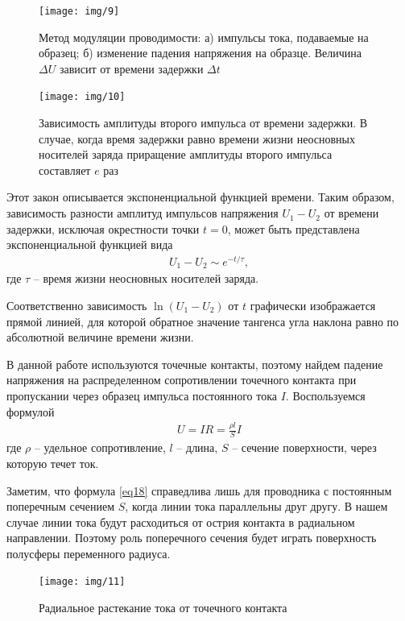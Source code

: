\begin{figure}[H]
	\centering
	\texttt{[image: img/9]}
	\caption{Метод модуляции проводимости: а) импульсы тока, подаваемые на образец; б) изменение падения напряжения на образце. Величина $\Delta U$ зависит от времени задержки $\Delta t$}
	\label{fig:figure8}
\end{figure}

\begin{figure}[H]
	\centering
	\texttt{[image: img/10]}
	\caption{Зависимость амплитуды второго импульса от времени задержки. В случае, когда время задержки равно времени жизни неосновных носителей заряда приращение амплитуды второго импульса составляет $e$ раз}
	\label{fig:figure9}
\end{figure}



Этот закон описывается экспоненциальной функцией времени. Таким образом, зависимость разности амплитуд импульсов напряжения  $U_1-U_2$ от времени задержки, исключая окрестности точки $t = 0$, может быть представлена экспоненциальной функцией вида
\begin{gather}
	\label{eq17}
	U_{1}-U_{2} \sim e^{-t/\tau},
\end{gather}
где $\tau$ -- время жизни неосновных носителей заряда.

Соответственно зависимость $\ln(U_1-U_2)$ от $t$ графически изображается прямой линией, для которой обратное значение тангенса угла наклона равно по абсолютной величине времени жизни.

В данной работе используются точечные контакты, поэтому найдем падение напряжения на распределенном сопротивлении точечного контакта при пропускании через образец импульса постоянного тока $I$. Воспользуемся формулой
\begin{gather}
	\label{eq18}
	U=I R=\frac{\rho l}{S} I
\end{gather}
где $\rho$ -- удельное сопротивление, $l$ -- длина, $S$ -- сечение поверхности, через которую течет ток. 

Заметим, что формула \eqref{eq18} справедлива лишь для проводника с постоянным поперечным сечением $S$, когда линии тока параллельны друг другу. 
В нашем случае линии тока будут расходиться от острия контакта в радиальном направлении. Поэтому роль поперечного сечения будет играть поверхность полусферы переменного радиуса.
\begin{figure}[H]
	\centering
	\texttt{[image: img/11]}
	\caption{Радиальное растекание тока от точечного контакта}
	\label{fig:figure10}
\end{figure}

